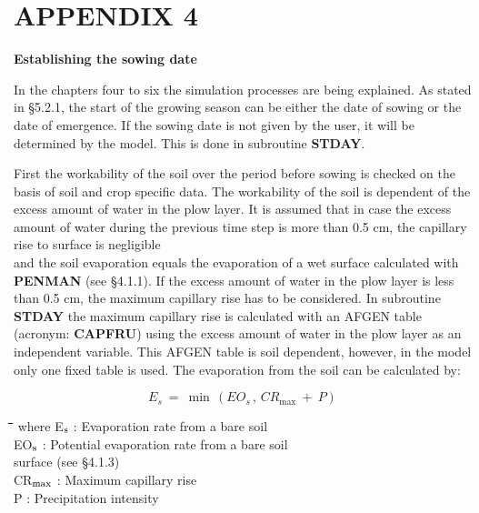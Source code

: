 \documentclass[11pt]{article}
\begin{document}
\setcounter{page}{127}\pagenumpos{\pnbr}
\section{  APPENDIX 4  }

\bigskip
{\bf {\large Establishing the sowing date }}

\bigskip
In the chapters four to six the simulation processes are being explained. As stated in
\S 5.2.1, the start of the growing season can be either the date of sowing or the date of
emergence. If the sowing date is not given by the user, it will be deter\-mined by the
model. This is done in subroutine {\bf STDAY}.

\bigskip
\bigskip
First the workability of the soil over the period before sowing is checked on the basis of
soil and crop specific data. The workability of the soil is dependent of the excess amount
of water in the plow layer. It is assumed that in case the excess amount of water during
the previous time step is more than 0.5 cm, the capillary rise to surface is negligible\\
and the soil evaporation equals the evaporation of a wet surface calculated with {\bf PEN\-MAN} (see \S 4.1.1). If the excess amount of water in the plow layer is less than 0.5 cm,
the maximum capillary rise has to be considered. In subroutine {\bf STDAY} the maxi\-mum
capillary rise is calculated with an AFGEN table (acronym: {\bf CAPFRU}) using the excess
amount of water in the plow layer as an independent variable. This AFGEN table is soil
dependent, however, in the model only one fixed table is used. The evaporation from the
soil can be calculated by:

\begin{displaymath}
E _{s} ~= ~\min \, (EO _{s} \, ,\, CR _{\max } ~+~ P)
\end{displaymath}

\bigskip
\nwln
\begin{tabbing}
\hspace{1.27cm}\=\hspace{1.27cm}\=\hspace{1.27cm}\=\hspace{1.27cm}\=%
\hspace{1.27cm}\=\hspace{1.27cm}\=\hspace{1.27cm}\=\hspace{1.27cm}\=%
\hspace{1.27cm}\=\hspace{1.27cm}\=\kill
where\> E$_{{\rm s}}$\> : Evaporation rate from a bare soil\> \> \> \> \> \> \> \> [cm d$^{{\rm -1}}$]\\
\>EO$_{{\rm s}}$\> : Potential evaporation rate from a bare soil \\
\>\>   surface (see \S 4.1.3)\> \> \> \> \> \> \> \> [cm]\\
\>CR$_{{\rm max}}$\> : Maximum capillary rise\> \> \> \> \> \> \> \> [cm d$^{{\rm -1}}$]\\
\>P \> : Precipitation intensity\> \> \> \> \> \> \> \> [cm d$^{{\rm -1}}$]
\end{tabbing}
\end{document}
